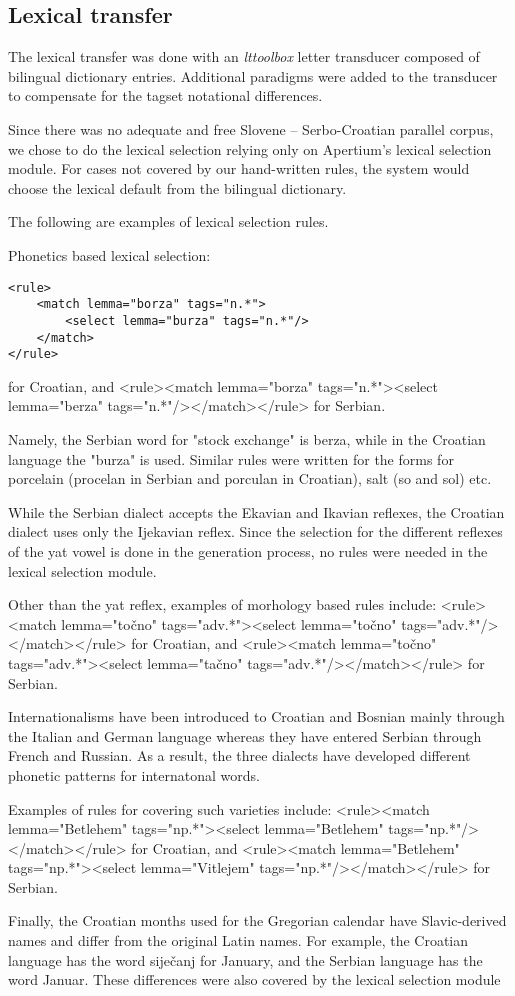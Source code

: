 \subsection{Lexical transfer}
The lexical transfer was done with an \emph{lttoolbox} letter
transducer composed of bilingual dictionary entries. Additional
paradigms were added to the transducer to compensate for the tagset
notational differences.

Since there was no adequate and free Slovene -- Serbo-Croatian parallel corpus, 
we chose to do the lexical selection relying only on Apertium's lexical selection module.
For cases not covered by our hand-written rules, the system would choose the lexical 
default from the bilingual dictionary.

The following are examples of lexical selection rules.

Phonetics based lexical selection:
{\small
\begin{Verbatim}
<rule>
    <match lemma="borza" tags="n.*">
        <select lemma="burza" tags="n.*"/>
    </match>
</rule>
\end{Verbatim}
for Croatian, and 
 <rule><match lemma="borza" tags="n.*"><select lemma="berza" tags="n.*"/></match></rule>
for Serbian.
}
Namely, the Serbian word for "stock exchange" is berza, while in the Croatian language the "burza" is used.
Similar rules were written for the forms for porcelain (procelan in Serbian and porculan in Croatian), 
salt (so and sol) etc.

While the Serbian dialect accepts the Ekavian and Ikavian reflexes, 
the Croatian dialect uses only the Ijekavian reflex.
Since the selection for the different reflexes of the yat vowel is done in the generation process,
no rules were needed in the lexical selection module.

Other than the yat reflex, examples of morhology based rules include:
 <rule><match lemma="točno" tags="adv.*"><select lemma="točno" tags="adv.*"/></match></rule>
for Croatian, and
 <rule><match lemma="točno" tags="adv.*"><select lemma="tačno" tags="adv.*"/></match></rule>
for Serbian.


Internationalisms have been introduced to Croatian and Bosnian mainly through the Italian and German language
whereas they have entered Serbian through French and Russian. 
As a result, the three dialects have developed different phonetic patterns for internatonal words.

Examples of rules for covering such varieties include:
 <rule><match lemma="Betlehem" tags="np.*"><select lemma="Betlehem" tags="np.*"/></match></rule>
for Croatian, and
 <rule><match lemma="Betlehem" tags="np.*"><select lemma="Vitlejem" tags="np.*"/></match></rule>
for Serbian.

Finally, the Croatian months used for the Gregorian calendar have Slavic-derived names and differ from the original Latin names.
For example, the Croatian language has the word siječanj for January, and 
the Serbian language has the word Januar.
These differences were also covered by the lexical selection module




